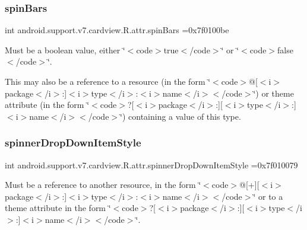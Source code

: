 \subsubsection{\texorpdfstring{spin\+Bars}{spinBars}}
{\footnotesize\ttfamily int android.\+support.\+v7.\+cardview.\+R.\+attr.\+spin\+Bars =0x7f0100be\hspace{0.3cm}{\ttfamily [static]}}

Must be a boolean value, either \char`\"{}$<$code$>$true$<$/code$>$\char`\"{} or \char`\"{}$<$code$>$false$<$/code$>$\char`\"{}. 

This may also be a reference to a resource (in the form \char`\"{}$<$code$>$@\mbox{[}$<$i$>$package$<$/i$>$\+:\mbox{]}$<$i$>$type$<$/i$>$\+:$<$i$>$name$<$/i$>$$<$/code$>$\char`\"{}) or theme attribute (in the form \char`\"{}$<$code$>$?\mbox{[}$<$i$>$package$<$/i$>$\+:\mbox{]}\mbox{[}$<$i$>$type$<$/i$>$\+:\mbox{]}$<$i$>$name$<$/i$>$$<$/code$>$\char`\"{}) containing a value of this type. \mbox{\label{classandroid_1_1support_1_1v7_1_1cardview_1_1R_1_1attr_a590a37b5fed89c38a8d1e814fd3d61ed}} 
\subsubsection{\texorpdfstring{spinner\+Drop\+Down\+Item\+Style}{spinnerDropDownItemStyle}}
{\footnotesize\ttfamily int android.\+support.\+v7.\+cardview.\+R.\+attr.\+spinner\+Drop\+Down\+Item\+Style =0x7f010079\hspace{0.3cm}{\ttfamily [static]}}

Must be a reference to another resource, in the form \char`\"{}$<$code$>$@\mbox{[}+\mbox{]}\mbox{[}$<$i$>$package$<$/i$>$\+:\mbox{]}$<$i$>$type$<$/i$>$\+:$<$i$>$name$<$/i$>$$<$/code$>$\char`\"{} or to a theme attribute in the form \char`\"{}$<$code$>$?\mbox{[}$<$i$>$package$<$/i$>$\+:\mbox{]}\mbox{[}$<$i$>$type$<$/i$>$\+:\mbox{]}$<$i$>$name$<$/i$>$$<$/code$>$\char`\"{}. \mbox{\label{classandroid_1_1support_1_1v7_1_1cardview_1_1R_1_1attr_acbf1a2eb7ad364b14112f295534337fc}} 
